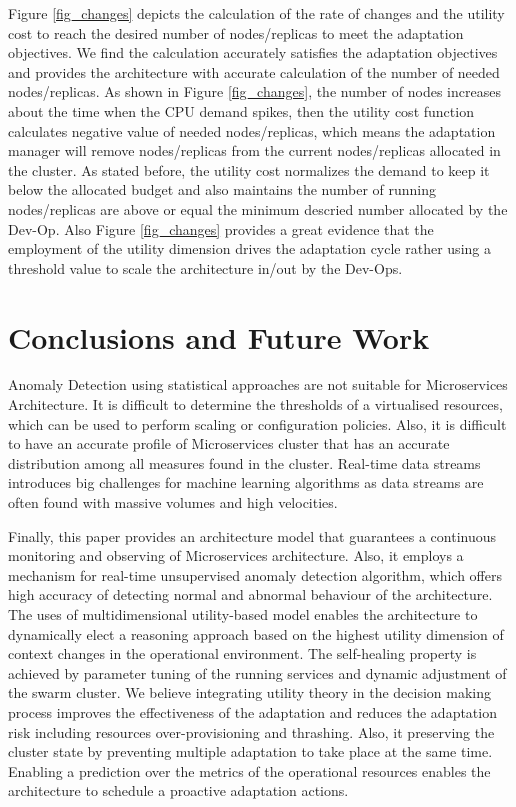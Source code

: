 \documentclass[sigconf]{acmart}
\begin{document}
Figure \ref{fig_changes} depicts the calculation of the rate of changes and the utility cost to reach the desired number of nodes/replicas to meet the adaptation objectives. We find the calculation accurately satisfies the adaptation objectives and provides the architecture with accurate calculation of the number of needed nodes/replicas. As shown in Figure \ref{fig_changes}, the number of nodes increases about the time when the CPU demand spikes, then the utility cost function calculates negative value of  needed nodes/replicas, which means the adaptation manager will remove nodes/replicas from the current nodes/replicas allocated in the cluster. As stated before, the utility cost normalizes the demand to keep it below the allocated budget and also maintains the number of running nodes/replicas are above or equal the minimum descried number allocated by the Dev-Op. Also  Figure \ref{fig_changes} provides a great evidence that the employment of the utility dimension drives the adaptation cycle rather using a threshold value to scale the architecture in/out by the Dev-Ops. 

 \section{Conclusions and Future Work}\label{sec:Conclusion}
 Anomaly Detection using statistical approaches are not suitable for Microservices Architecture. It is difficult to determine the thresholds of a virtualised resources, which can be used to perform scaling or configuration policies. 
Also, it is difficult to have an accurate profile of Microservices cluster that has an accurate distribution among all measures found in the cluster. Real-time data streams introduces big challenges for machine learning algorithms as data streams are often found with massive volumes and high velocities. 

Finally, this paper provides an architecture model that guarantees a continuous monitoring and observing of Microservices architecture. Also, it employs a mechanism for real-time unsupervised anomaly detection algorithm, which offers high accuracy of detecting normal and abnormal behaviour of the architecture. The uses of multidimensional utility-based model enables the architecture to dynamically elect a reasoning approach based on the highest utility dimension of context changes in the operational environment. The self-healing property is achieved by parameter tuning of the running services and dynamic adjustment of the swarm cluster. We believe integrating utility theory in the decision making process improves the effectiveness of the adaptation and reduces the adaptation risk including resources over-provisioning and thrashing. Also, it preserving the cluster state by preventing multiple adaptation to take place at the same time. Enabling a prediction over the metrics of the operational resources enables the architecture to schedule a proactive adaptation actions. 
\end{document}
